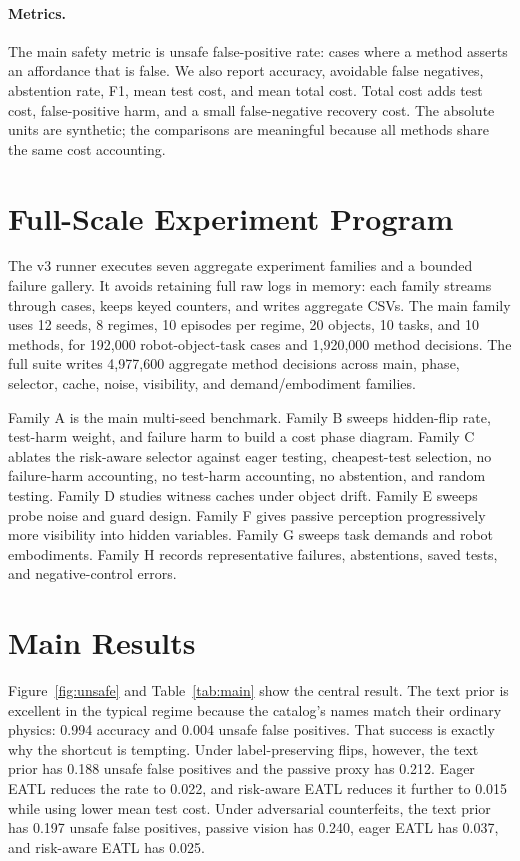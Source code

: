 \documentclass{article}
\begin{document}
\paragraph{Metrics.}
The main safety metric is unsafe false-positive rate: cases where a method
asserts an affordance that is false.  We also report accuracy, avoidable false
negatives, abstention rate, F1, mean test cost, and mean total cost.  Total cost
adds test cost, false-positive harm, and a small false-negative recovery cost.
The absolute units are synthetic; the comparisons are meaningful because all
methods share the same cost accounting.

\section{Full-Scale Experiment Program}

The v3 runner executes seven aggregate experiment families and a bounded failure
gallery.  It avoids retaining full raw logs in memory: each family streams
through cases, keeps keyed counters, and writes aggregate CSVs.  The main family
uses 12 seeds, 8 regimes, 10 episodes per regime, 20 objects, 10 tasks, and 10
methods, for 192,000 robot-object-task cases and 1,920,000 method decisions.
The full suite writes 4,977,600 aggregate method decisions across main, phase,
selector, cache, noise, visibility, and demand/embodiment families.

Family A is the main multi-seed benchmark.  Family B sweeps hidden-flip rate,
test-harm weight, and failure harm to build a cost phase diagram.  Family C
ablates the risk-aware selector against eager testing, cheapest-test selection,
no failure-harm accounting, no test-harm accounting, no abstention, and random
testing.  Family D studies witness caches under object drift.  Family E sweeps
probe noise and guard design.  Family F gives passive perception progressively
more visibility into hidden variables.  Family G sweeps task demands and robot
embodiments.  Family H records representative failures, abstentions, saved
tests, and negative-control errors.

\section{Main Results}

Figure~\ref{fig:unsafe} and Table~\ref{tab:main} show the central result.  The
text prior is excellent in the typical regime because the catalog's names match
their ordinary physics: 0.994 accuracy and 0.004 unsafe false positives.  That
success is exactly why the shortcut is tempting.  Under label-preserving flips,
however, the text prior has 0.188 unsafe false positives and the passive proxy
has 0.212.  Eager EATL reduces the rate to 0.022, and risk-aware EATL reduces it
further to 0.015 while using lower mean test cost.  Under adversarial
counterfeits, the text prior has 0.197 unsafe false positives, passive vision
has 0.240, eager EATL has 0.037, and risk-aware EATL has 0.025.
\end{document}
